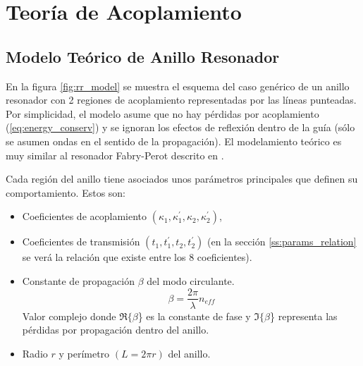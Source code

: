 \section{Teoría de Acoplamiento}
\label{sc:coupling_theory}

\subsection{Modelo Teórico de Anillo Resonador}
\label{ss:generic_theory}

En la figura \ref{fig:rr_model} se muestra el esquema del caso genérico de 
un anillo resonador con 2 regiones de acoplamiento representadas 
por las líneas punteadas. 
Por simplicidad, el modelo asume que no hay pérdidas por 
acoplamiento (\ref{eq:energy_conserv}) y se ignoran los efectos de reflexión 
dentro de la guía (sólo se asumen ondas en el sentido de la propagación). 
El modelamiento teórico es muy similar al resonador Fabry-Perot descrito en
\cite{verdeyen1989laser}.

Cada región del anillo tiene asociados unos parámetros principales que definen su 
comportamiento. Estos son:
\begin{itemize}
\item Coeficientes de acoplamiento $(\kappa_1,\kappa_1^{'},\kappa_2,\kappa_2^{'})$,
\item Coeficientes de transmisión $(t_1, t_1^{'}, t_2, t_2^{'})$ (en la sección 
\ref{ss:params_relation} se verá la relación que existe entre los 8 coeficientes). 
\item Constante de propagación $\beta$ del modo circulante. 
\begin{equation}
\beta=\frac{2 \pi}{\lambda} n_{eff}
\label{eq:beta}
\end{equation} 
Valor complejo donde $\Re\{\beta$\} es la constante de fase 
y $\Im\{\beta$\} representa las pérdidas por propagación
dentro del anillo.
\item Radio $r$ y perímetro $(L=2 \pi r)$ del anillo.
\end{itemize} 


